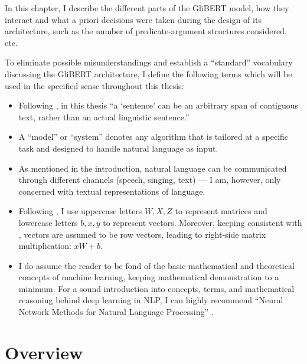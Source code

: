 
\label{chap:4_architecture}

In this chapter, I describe the different parts of the GliBERT model, how they interact and
what a priori decisions were taken during the design of its architecture, such as the number
of predicate-argument structures considered, etc.

To eliminate possible misunderstandings and establish a ``standard'' vocabulary discussing the GliBERT
architecture, I define the following terms which will be used in the specified sense throughout
this thesis:

\begin{itemize}
  \item Following \cite{devlin2018bert}, in this thesis ``a `sentence' can be an arbitrary span of contiguous text, rather
    than an actual linguistic sentence.''
  \item A ``model'' or ``system'' denotes any algorithm that is tailored at a specific task and designed
    to handle natural language as input.
  \item As mentioned in the introduction, natural language can be communicated through different channels (speech, singing, text)
    --- I am, however, only concerned with textual representations of language.
  \item Following \cite{goldberg2017neural}, I use uppercase letters $W, X, Z$ to represent matrices and lowercase
    letters $b, x, y$ to represent vectors. Moreover, keeping consistent with \citeauthor{goldberg2017neural},
    vectors are assumed to be row vectors, leading to right-side matrix multiplication: $xW + b$.
  \item I do assume the reader to be fond of the basic mathematical and theoretical concepts of machine learning,
    keeping mathematical demonstration to a minimum. For a sound introduction into concepts, terms, and mathematical
    reasoning behind deep learning in NLP, I can highly recommend ``Neural Network Methods for Natural Language Processing'' \citep{goldberg2017neural}.
\end{itemize}



\section{Overview}

